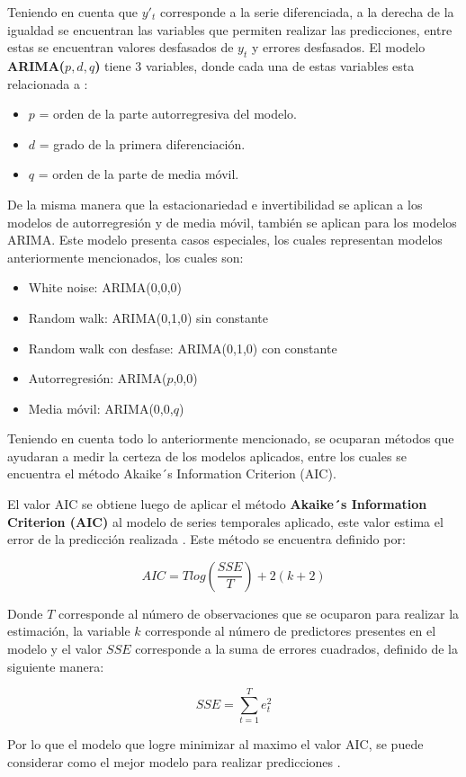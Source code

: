 Teniendo en cuenta que $y'_t$ corresponde a la serie diferenciada, a la derecha de la igualdad se encuentran las variables que permiten realizar las predicciones, entre estas se encuentran valores desfasados de $y_t$ y errores desfasados.
El modelo \textbf{ARIMA($p,d,q$)} tiene 3 variables, donde cada una de estas variables esta relacionada a \cite{forecast-time-series-arima}:
\begin{itemize}
    \item $p$ = orden de la parte autorregresiva del modelo.
    \item $d$ = grado de la primera diferenciación.
    \item $q$ = orden de la parte de media móvil.
\end{itemize}

De la misma manera que la estacionariedad e invertibilidad se aplican a los modelos de autorregresión y de media móvil, también se aplican para los modelos ARIMA. Este modelo presenta casos especiales, los cuales representan modelos anteriormente mencionados, los cuales son:
\begin{itemize}
    \item White noise: ARIMA(0,0,0)
    \item Random walk: ARIMA(0,1,0) sin constante
    \item Random walk con desfase: ARIMA(0,1,0) con constante
    \item Autorregresión: ARIMA($p$,0,0)
    \item Media móvil: ARIMA(0,0,$q$)
\end{itemize}

Teniendo en cuenta todo lo anteriormente mencionado, se ocuparan métodos que ayudaran a medir la certeza de los modelos aplicados, entre los cuales se encuentra el método Akaike´s Information Criterion (AIC).

El valor AIC se obtiene luego de aplicar el método \textbf{Akaike´s Information Criterion (AIC)} al modelo de series temporales aplicado, este valor estima el error de la predicción realizada \cite{forecast-time-series-arima}. Este método se encuentra definido por:

\begin{equation*}
    AIC = Tlog(\frac{SSE}{T}) + 2(k+2)
\end{equation*}

Donde $T$ corresponde al número de observaciones que se ocuparon para realizar la estimación, la variable $k$ corresponde al número de predictores presentes en el modelo y el valor $SSE$ corresponde a la suma de errores cuadrados, definido de la siguiente manera\cite{forecast-time-series-arima}:

\begin{equation*}
    SSE = \sum_{t=1}^{T}{e_t^{2}}
\end{equation*}

Por lo que el modelo que logre minimizar al maximo el valor AIC, se puede considerar como el mejor modelo para realizar predicciones \cite{forecast-time-series-arima}.